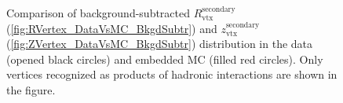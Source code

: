 \begin{figure}[hb]
\centering
\parbox{0.4725\textwidth}{
  \centering
  \begin{subfigure}[b]{\linewidth}
                \vspace{-5pt}
  \end{subfigure}
}%
\quad\quad%
\parbox{0.4725\textwidth}{
  \centering
  \begin{subfigure}[b]{\linewidth}
                \vspace{-5pt}
  \end{subfigure}
}%
\caption[Comparison of background-subtracted $R_{\text{vtx}}^{\text{secondary}}$ and $z_{\text{vtx}}^{\text{secondary}}$ distribution in the data and embedded MC.]%
    {Comparison of background-subtracted $R_{\text{vtx}}^{\text{secondary}}$ (\ref{fig:RVertex_DataVsMC_BkgdSubtr}) and $z_{\text{vtx}}^{\text{secondary}}$ (\ref{fig:ZVertex_DataVsMC_BkgdSubtr}) distribution in the data (opened black circles) and embedded MC (filled red circles). Only vertices recognized as products of hadronic interactions are shown in the figure.}\label{fig:RZVertexDataVsMC_BkgdSubtr}%
\end{figure}
